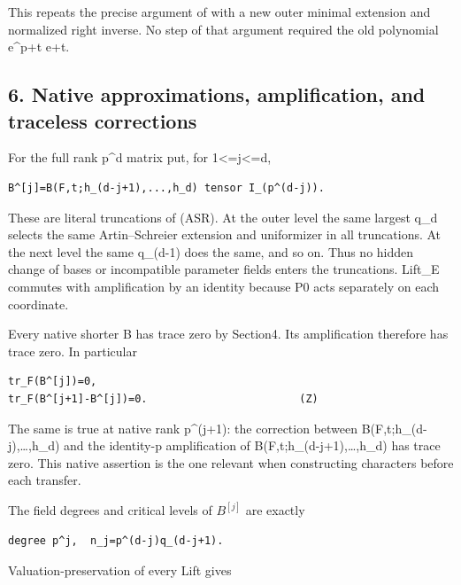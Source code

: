 This repeats the precise argument of  with a new
outer minimal extension and normalized right inverse. No step of that
argument required the old polynomial e\^{}p+t e+t.

\hypertarget{odd_tower-native-approximations-amplification-and-traceless-corrections}{%
\subsection{6. Native approximations, amplification, and traceless
corrections}\label{odd_tower-native-approximations-amplification-and-traceless-corrections}}

For the full rank p\^{}d matrix put, for 1\textless=j\textless=d,

\begin{Verbatim}[fontsize=\small,breaklines=true,breakanywhere=true]
B^[j]=B(F,t;h_(d-j+1),...,h_d) tensor I_(p^(d-j)).
\end{Verbatim}

These are literal truncations of (ASR). At the outer level the same
largest q\_d selects the same Artin--Schreier extension and uniformizer
in all truncations. At the next level the same q\_(d-1) does the same,
and so on. Thus no hidden change of bases or incompatible parameter
fields enters the truncations. Lift\_E commutes with amplification by an
identity because P0 acts separately on each coordinate.

Every native shorter B has trace zero by Section4. Its amplification
therefore has trace zero. In particular

\begin{Verbatim}[fontsize=\small,breaklines=true,breakanywhere=true]
tr_F(B^[j])=0,
tr_F(B^[j+1]-B^[j])=0.                        (Z)
\end{Verbatim}

The same is true at native rank p\^{}(j+1): the correction between
B(F,t;h\_(d-j),\ldots,h\_d) and the identity-p amplification of
B(F,t;h\_(d-j+1),\ldots,h\_d) has trace zero. This native assertion is
the one relevant when constructing characters before each transfer.

The field degrees and critical levels of \(B^{[j]}\) are exactly

\begin{Verbatim}[fontsize=\small,breaklines=true,breakanywhere=true]
degree p^j,  n_j=p^(d-j)q_(d-j+1).
\end{Verbatim}

Valuation-preservation of every Lift gives

